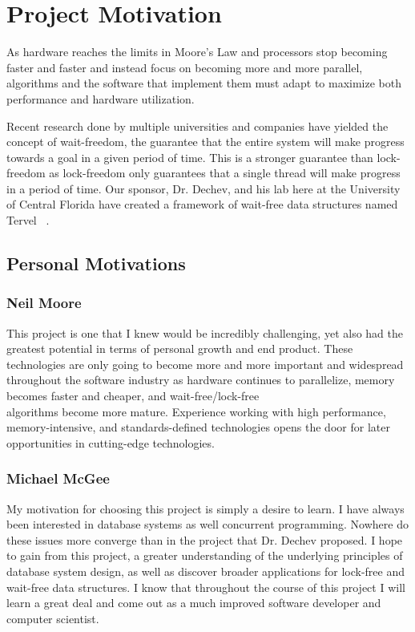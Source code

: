 \documentclass[letterpaper, 11pt]{article}
\begin{document}
\newpage

\section{Project Motivation}
As hardware reaches the limits in Moore's Law and processors stop becoming faster and faster
and instead focus on becoming more and more parallel, algorithms and the software that implement
them must adapt to maximize both performance and hardware utilization.
\par\vspace{\baselineskip}
Recent research done by multiple universities and companies have yielded the concept of wait-freedom,
the guarantee that the entire system will make progress towards a goal in a given period of time.
This is a stronger guarantee than lock-freedom as lock-freedom only guarantees that a single thread
will make progress in a period of time. Our sponsor, Dr. Dechev, and his lab here at the University
of Central Florida have created a framework of wait-free data structures named Tervel ~\cite{tervel}.

\subsection{Personal Motivations}
\subsubsection{Neil Moore}
This project is one that I knew would be incredibly challenging, yet also had the greatest
potential in terms of personal growth and end product. These technologies are only going to
become more and more important and widespread throughout the software industry as hardware
continues to parallelize, memory becomes faster and cheaper, and wait-free/lock-free  \\ algorithms
become more mature. Experience working with high performance, memory-intensive, and
standards-defined technologies opens the door for later opportunities in cutting-edge technologies.

\subsubsection{Michael McGee}
My motivation for choosing this project is simply a desire to learn. I have always been
interested in database systems as well concurrent programming. Nowhere do these issues
more converge than in the project that Dr. Dechev proposed. I hope to gain from this
project, a greater understanding of the underlying principles of database system design,
as well as discover broader applications for lock-free and wait-free data structures. I
know that throughout the course of this project I will learn a great deal and come out
as a much improved software developer and computer scientist.
\end{document}
